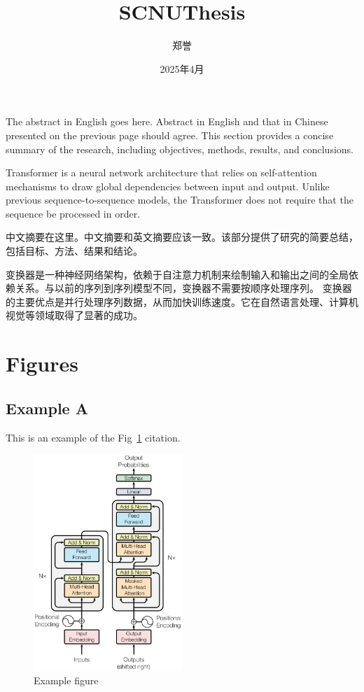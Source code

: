\documentclass{scnuthesis}
\title{SCNUThesis}
\author{郑誉}
\date{2025年4月}
\begin{document}
    \maketitle

    \begin{abstracten}
        The abstract in English goes here. Abstract in English and that in
        Chinese presented on the previous page should agree. This section provides
        a concise summary of the research, including objectives, methods,
        results, and conclusions.

        Transformer is a neural network architecture that relies on self-attention
        mechanisms to draw global dependencies between input and output. Unlike
        previous sequence-to-sequence models, the Transformer does not require that
        the sequence be processed in order.
    \end{abstracten}

    \begin{abstractzh}
        中文摘要在这里。中文摘要和英文摘要应该一致。该部分提供了研究的简要总结，包括目标、方法、结果和结论。

        变换器是一种神经网络架构，依赖于自注意力机制来绘制输入和输出之间的全局依赖关系。与以前的序列到序列模型不同，变换器不需要按顺序处理序列。
        变换器的主要优点是并行处理序列数据，从而加快训练速度。它在自然语言处理、计算机视觉等领域取得了显著的成功。
    \end{abstractzh}

    \toc


    \section{Figures}
    \subsection{Example A}
    This is an example of the Fig~\ref{fig:example-figure} citation.

    \begin{figure}[htbp]
        \centering
        \includegraphics[width=0.5\textwidth]{fig/transformer.eps}
        \caption{Example figure}
        \label{fig:example-figure}
    \end{figure}
\end{document}
